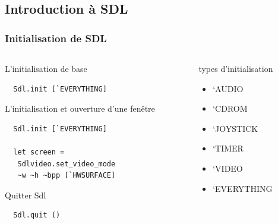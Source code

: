 \subsection{Introduction à SDL} %
\begin{frame}[fragile]
	\frametitle{Initialisation de SDL}
	\begin{columns}
		\begin{column}{5cm}
			\begin{block}{L'initialisation de base}
				\lstset{basicstyle=\small}
				\begin{lstlisting}
  Sdl.init [`EVERYTHING] 
				\end{lstlisting}
			\end{block}
			\begin{block}{L'initialisation et ouverture d'une fenêtre}
				\lstset{basicstyle=\small}
				\begin{lstlisting}
  Sdl.init [`EVERYTHING]

  let screen = 
   Sdlvideo.set_video_mode 
   ~w ~h ~bpp [`HWSURFACE]
				\end{lstlisting}
			\end{block}
			\begin{block}{Quitter Sdl}
				\lstset{basicstyle=\small}
				\begin{lstlisting}
  Sdl.quit ()
				\end{lstlisting}
			\end{block}
		\end{column}
		\begin{column}{3.3cm}
			\begin{block}{types d'initialisation}
				\begin{itemize}
					\item `AUDIO
					\item `CDROM
					\item `JOYSTICK
					\item `TIMER
					\item `VIDEO
				\end{itemize}
				\begin{itemize}
					\item `EVERYTHING
				\end{itemize}
			\end{block}
		\end{column}
	\end{columns}
\end{frame}


